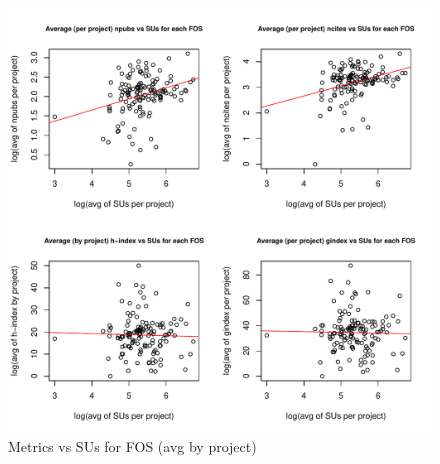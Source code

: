 \documentclass{sig-alternate}
\begin{document}
\begin{figure}[htb] 
  \centering 
    \includegraphics[width=1.0\columnwidth]{images/08_metrics_vs_alloc_avg_log_fit.pdf} 
  \caption{Metrics vs SUs for FOS (avg by project)}\label{F:metrics-vs-alloc-avg-log-fit} 
\end{figure} 
 
\end{document}
